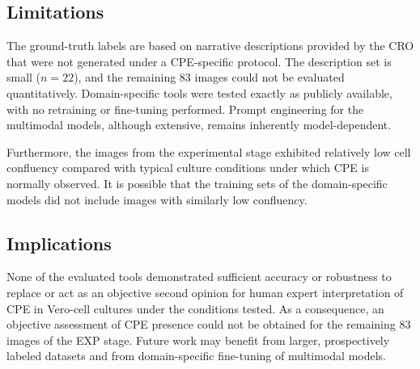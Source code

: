 \subsection*{Limitations}
The ground-truth labels are based on narrative descriptions provided by the CRO that were not generated under a CPE-specific protocol. The description set is small (\(n = 22\)), and the remaining 83 images could not be evaluated quantitatively. Domain-specific tools were tested exactly as publicly available, with no retraining or fine-tuning performed. Prompt engineering for the multimodal models, although extensive, remains inherently model-dependent.

Furthermore, the images from the experimental stage exhibited relatively low cell confluency compared with typical culture conditions under which CPE is normally observed. It is possible that the training sets of the domain-specific models did not include images with similarly low confluency.

\subsection*{Implications}
None of the evaluated tools demonstrated sufficient accuracy or robustness to replace or act as an objective second opinion for human expert interpretation of CPE in Vero-cell cultures under the conditions tested. As a consequence, an objective assessment of CPE presence could not be obtained for the remaining 83 images of the EXP stage. Future work may benefit from larger, prospectively labeled datasets and from domain-specific fine-tuning of multimodal models.